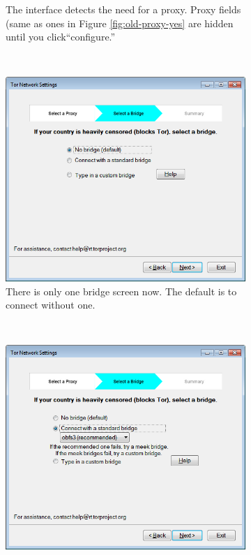 \documentclass[USenglish,oneside,twocolumn]{article}
\begin{document}
\begin{figure}
\begin{subfigure}[b]{0.30\textwidth}
	\caption{The interface detects the need for a proxy. Proxy fields (same as ones in Figure \ref{fig:old-proxy-yes} are hidden until you click``configure.''}
	\label{fig:new-proxy}
\end{subfigure}
~~~~~~~~~~
\begin{subfigure}[b]{0.30\textwidth}
	\includegraphics[width=\textwidth]{screenshots/NEW-bridgeSettings.png}
	\caption{There is only one bridge screen now. The default is to connect without one.}
	\label{fig:new-nobridge}
\end{subfigure}
~~~~~~~~~~
\begin{subfigure}[b]{0.30\textwidth}
	\includegraphics[width=\textwidth]{screenshots/NEW-bridgeSettings-default.png}

\end{subfigure}
\end{figure}
\end{document}

